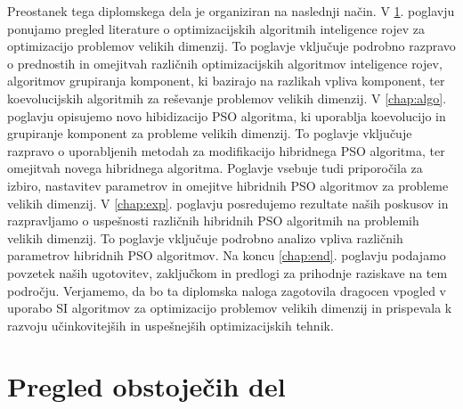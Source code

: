 Preostanek tega diplomskega dela je organiziran na naslednji način.
V \ref{chap:obsojeca.dela}. poglavju ponujamo pregled literature o optimizacijskih algoritmih inteligence rojev za optimizacijo problemov velikih dimenzij.
To poglavje vključuje podrobno razpravo o prednostih in omejitvah različnih optimizacijskih algoritmov inteligence rojev, algoritmov grupiranja komponent, ki bazirajo na razlikah vpliva komponent, ter koevolucijskih algoritmih za reševanje problemov velikih dimenzij.
V \ref{chap:algo}. poglavju opisujemo novo hibidizacijo PSO algoritma, ki uporablja koevolucijo in grupiranje komponent za probleme velikih dimenzij.
To poglavje vključuje razpravo o uporabljenih metodah za modifikacijo hibridnega PSO algoritma, ter omejitvah novega hibridnega algoritma.
Poglavje vsebuje tudi priporočila za izbiro, nastavitev parametrov in omejitve hibridnih PSO algoritmov za probleme velikih dimenzij.
V \ref{chap:exp}. poglavju posredujemo rezultate naših poskusov in razpravljamo o uspešnosti različnih hibridnih PSO algoritmih na problemih velikih dimenzij.
To poglavje vključuje podrobno analizo vpliva različnih parametrov hibridnih PSO algoritmov.
Na koncu \ref{chap:end}. poglavju podajamo povzetek naših ugotovitev, zaključkom in predlogi za prihodnje raziskave na tem področju. Verjamemo, da bo ta diplomska naloga zagotovila dragocen vpogled v uporabo SI algoritmov za optimizacijo problemov velikih dimenzij in prispevala k razvoju učinkovitejših in uspešnejših optimizacijskih tehnik.

\chapter{Pregled obstoječih del}\label{chap:obsojeca.dela}

